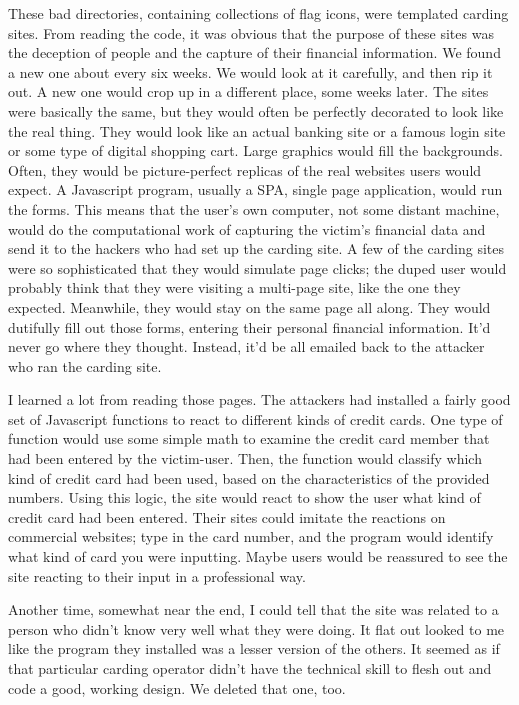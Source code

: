 These bad directories, containing collections of flag icons, were templated carding sites.  From reading the code, it was obvious that the purpose of these sites was the deception of people and the capture of their financial information.  We found a new one about every six weeks.  We would look at it carefully, and then rip it out.  A new one would crop up in a different place, some weeks later.  The sites were basically the same, but they would often be perfectly decorated to look like the real thing.  They would look like an actual banking site or a famous login site or some type of digital shopping cart.  Large graphics would fill the backgrounds.  Often, they would be picture-perfect replicas of the real websites users would expect.  A Javascript program, usually a SPA, single page application, would run the forms.  This means that the user's own computer, not some distant machine, would do the computational work of capturing the victim's financial data and send it to the hackers who had set up the carding site.  A few of the carding sites were so sophisticated that they would simulate page clicks; the duped user would probably think that they were visiting a multi-page site, like the one they expected.  Meanwhile, they would stay on the same page all along.  They would dutifully fill out those forms, entering their personal financial information.  It'd never go where they thought.  Instead, it'd be all emailed back to the attacker who ran the carding site.

I learned a lot from reading those pages.  The attackers had installed a fairly good set of Javascript functions to react to different kinds of credit cards.  One type of function would use some simple math to examine the credit card member that had been entered by the victim-user.  Then, the function would classify which kind of credit card had been used, based on the characteristics of the provided numbers.  Using this logic, the site would react to show the user what kind of credit card had been entered.  Their sites could imitate the reactions on commercial websites; type in the card number, and the program would identify what kind of card you were inputting.  Maybe users would be reassured to see the site reacting to their input in a professional way.

Another time, somewhat near the end, I could tell that the site was related to a person who didn't know very well what they were doing.  It flat out looked to me like the program they installed was a lesser version of the others.  It seemed as if that particular carding operator didn't have the technical skill to flesh out and code a good, working design.  We deleted that one, too.

